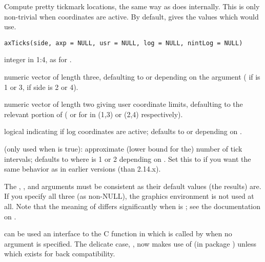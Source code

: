 %
\begin{Description}\relax
Compute pretty tickmark locations, the same way as \R{} does internally.
This is only non-trivial when  coordinates are active.
By default, gives the  values which
 would use.
\end{Description}
%
\begin{Usage}
\begin{verbatim}
axTicks(side, axp = NULL, usr = NULL, log = NULL, nintLog = NULL)
\end{verbatim}
\end{Usage}
%
\begin{Arguments}
\begin{ldescription}
\item[\code{side}] integer in 1:4, as for .
\item[\code{axp}] numeric vector of length three, defaulting to
 or 
depending on the  argument (
if  is 1 or 3,  if side is 2 or 4).
\item[\code{usr}] numeric vector of length two giving user coordinate
limits, defaulting to the relevant portion of
 ( or
 for  in (1,3) or (2,4)
respectively).
\item[\code{log}] logical indicating if log coordinates are active; defaults
to  or 
depending on .
\item[\code{nintLog}] (only used when  is true): approximate (lower
bound for the) number of tick intervals; defaults to
 where  is 1 or 2 depending on
.  Set this to  if you want the same behavior
as in earlier \R{} versions (than 2.14.x).
\end{ldescription}
\end{Arguments}
%
\begin{Details}\relax
The , , and  arguments must be consistent
as their default values (the  results) are.  If you
specify all three (as non-NULL), the graphics environment is not used
at all.  Note that the meaning of  differs significantly
when  is ; see the documentation on
.

 can be used an \R{} interface to the C function
 in 
which is called by  when no argument
 is specified.
The delicate case, , now makes use of
 (in package ) unless
 which exists for back compatibility.
\end{Details}
